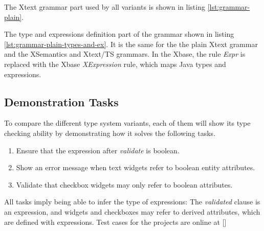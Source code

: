 The Xtext grammar part used by all variants is shown in listing \ref{lst:grammar-plain}. 



The type and expressions definition part of the grammar shown in listing \ref{lst:grammar-plain-types-and-ex}. It is the same for the the plain Xtext grammar and the XSemantics and Xtext/TS grammars. In the Xbase, the rule \emph{Expr} is replaced with the Xbase \emph{XExpression} rule, which maps Java types and expressions.



\subsection{Demonstration Tasks}
To compare the different type system variants, each of them will show its type checking ability by demonstrating how it solves the following tasks.
\begin{enumerate}
\item Ensure that the expression after \emph{validate} is boolean.
\item Show an error message when text widgets refer to boolean entity attributes.
\item Validate that checkbox widgets may only refer to boolean attributes.
\end{enumerate}

All tasks imply being able to infer the type of expressions: The \emph{validated} clause is an expression, and widgets and checkboxes may refer to derived attributes, which are defined with expressions. Test cases for the projects are online at []%
